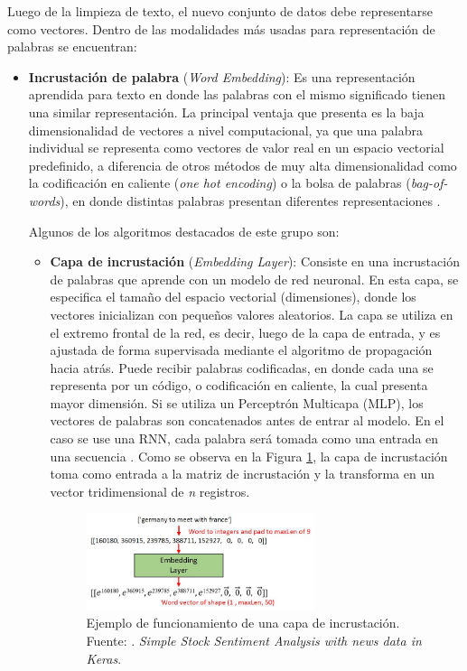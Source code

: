Luego de la limpieza de texto, el nuevo conjunto de datos debe representarse como vectores. Dentro de las modalidades más usadas para representación de palabras se encuentran:
\begin{itemize}
	\item \textbf{Incrustación de palabra} (\textit{Word Embedding}): Es una representación aprendida para texto en donde las palabras con el mismo significado tienen una similar representación. La principal ventaja que presenta es la baja dimensionalidad de vectores a nivel computacional, ya que una palabra individual se representa como vectores de valor real en un espacio vectorial predefinido, a diferencia de otros métodos de muy alta dimensionalidad como la codificación en caliente (\textit{one hot encoding}) o la bolsa de palabras (\textit{bag-of-words}), en donde distintas palabras presentan diferentes representaciones \parencite{bk_brownlee2017deeplearning_nlp}.
	
	Algunos de los algoritmos destacados de este grupo son:
	\begin{itemize}
		\item \textbf{Capa de incrustación} (\textit{Embedding Layer}): Consiste en una incrustación de palabras que aprende con un modelo de red neuronal. En esta capa, se especifica el tamaño del espacio vectorial (dimensiones), donde los vectores inicializan con pequeños valores aleatorios. La capa se utiliza en el extremo frontal de la red, es decir, luego de la capa de entrada, y es ajustada de forma supervisada mediante el algoritmo de propagación hacia atrás. Puede recibir palabras codificadas, en donde cada una se representa por un código, o codificación en caliente, la cual presenta mayor dimensión. Si se utiliza un Perceptrón Multicapa (MLP), los vectores de palabras son concatenados antes de entrar al modelo. En el caso se use una RNN, cada palabra será tomada como una entrada en una secuencia \parencite{bk_brownlee2017deeplearning_nlp}. Como se observa en la Figura \ref{2:fig47}, la capa de incrustación toma como entrada a la matriz de incrustación y la transforma en un vector tridimensional de \textit{n} registros.
		
		\begin{figure}[!ht]
			\begin{center}
				\includegraphics[width=0.67\textwidth]{2/figures/embedding_layer.jpg}
				\caption[Ejemplo de funcionamiento de una capa de incrustación]{Ejemplo de funcionamiento de una capa de incrustación.\\
				Fuente: \cite{tec_chengwei2018embedding}. \textit{Simple Stock Sentiment Analysis with news data in Keras}.}
				\label{2:fig47}
			\end{center}
		\end{figure}
		

\end{itemize}
\end{itemize}

